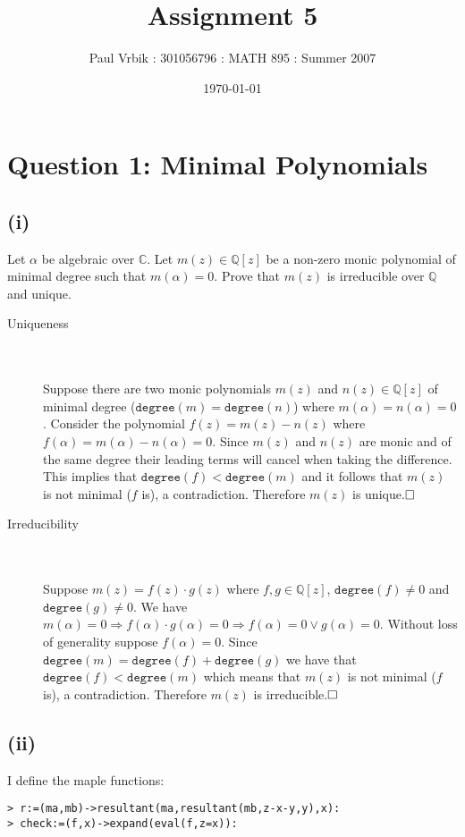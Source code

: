 \documentclass[10pt]{report}
\title{Assignment 5}
\author{Paul Vrbik : 301056796 : MATH 895 : Summer 2007}
\date{\today}
\newcommand{\state}[1]{\item[#1] \textcolor{white}{.} \\ \textcolor{white}{.} \\ }
\renewcommand{\deg}[1]{\texttt{degree}(#1)}
\renewcommand{\implies}{\Rightarrow}
\begin{document}
\maketitle

\section*{Question 1: Minimal Polynomials}

\subsection*{(i)}

Let $\alpha$ be algebraic over $\mathbb{C}$. Let $m(z) \in \mathbb{Q}[z]$ be a non-zero monic polynomial of minimal degree such that $m(\alpha) = 0$. Prove that $m(z)$ is irreducible over $\mathbb{Q}$ and unique.

\begin{description}
\state{Uniqueness} 
Suppose there are two monic polynomials $m(z)$ and $n(z) \in \mathbb{Q}[z]$ of minimal degree ($\deg{m}=\deg{n}$) where $m(\alpha)=n(\alpha)=0$. Consider the polynomial $f(z)=m(z)-n(z)$ where $f(\alpha)=m(\alpha)-n(\alpha)=0$. Since $m(z)$ and $n(z)$ are monic and of the same degree their leading terms will cancel when taking the difference. This implies that $\deg{f} < \deg{m}$ and it follows that $m(z)$ is not minimal ($f$ is), a contradiction. Therefore $m(z)$ is unique.$\hfill \Box$

\state{Irreducibility}
Suppose $m(z)=f(z) \cdot g(z)$ where $f,g \in \mathbb{Q}[z]$, $\deg{f} \neq 0$ and $\deg{g} \neq 0$. We have $m(\alpha)=0 \implies f(\alpha) \cdot g(\alpha) = 0 \implies f(\alpha)=0 \vee g(\alpha)=0$. Without loss of generality suppose $f(\alpha)=0$. Since $\deg{m}=\deg{f}+\deg{g}$ we have that $\deg{f}<\deg{m}$ which means that $m(z)$ is not minimal ($f$ is), a contradiction. Therefore $m(z)$ is irreducible.$\hfill \Box$

\end{description}

\subsection*{(ii)}

I define the maple functions:
\begin{verbatim}
> r:=(ma,mb)->resultant(ma,resultant(mb,z-x-y,y),x):
> check:=(f,x)->expand(eval(f,z=x)):
\end{verbatim}
\end{document}
